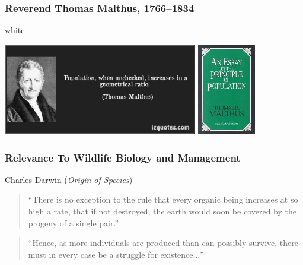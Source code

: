 \documentclass[color=usenames,dvipsnames]{beamer}\usepackage[]{graphicx}\usepackage[]{xcolor}
\begin{document}
\begin{frame}
  \frametitle{Reverend Thomas Malthus, 1766--1834}
  \begin{beamercolorbox}[wd=\paperwidth]{white}
    \begin{center}
      \includegraphics[height=4cm,keepaspectratio]{figs/MalthusGeometric}
      \hspace{0.1cm}
      \includegraphics[height=4cm,keepaspectratio]{figs/MalthusBookCover}
    \end{center}
  \end{beamercolorbox}
\end{frame}


\begin{frame}
  \frametitle{\normalsize Relevance To Wildlife Biology and Management}
  Charles Darwin (\textit{Origin of Species})
  \begin{quote}
    ``There is no exception to the rule that every organic being
    increases at so high a rate, that if not destroyed, the earth
    would soon be covered by the progeny of a single pair.''
  \end{quote}
  \pause
  \vfill
  \begin{quote}
    ``Hence, as more individuals are produced than can possibly survive,
    there must in every case be a struggle for existence$\dots$''
  \end{quote}
\end{frame}
\end{document}
